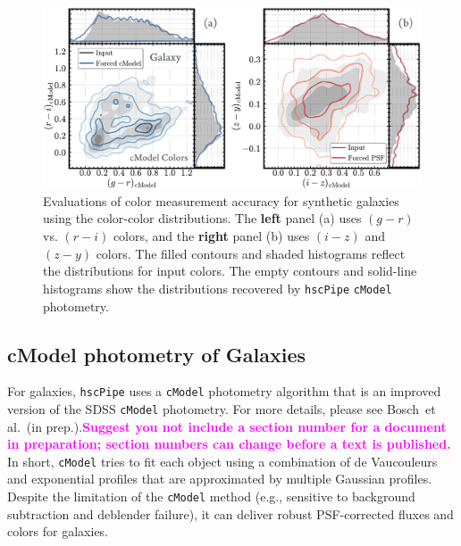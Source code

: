 \documentclass[useamsfonts]{pasj01}
\def\etal{{\ et al.~}}
\def\hscpipe{\texttt{hscPipe}}
\def\cmodel{\texttt{cModel}}
\newcommand{\susan}[1]{\textcolor{magenta} {\textbf{#1}}}
\begin{document}
\begin{figure}
    \begin{center}
        \includegraphics[width=\textwidth]{fig/synpipe_galaxy_cdist}
    \end{center}
    \caption{
        Evaluations of color measurement accuracy for synthetic galaxies
        using the color-color distributions.
        The \textbf{left} panel (a) uses $(g-r)$ vs. $(r-i)$ colors, and the \textbf{right} panel (b)
        uses $(i-z)$ and $(z-y)$ colors.
        The filled contours and shaded histograms reflect the distributions for input
        colors.
        The empty contours and solid-line histograms show the distributions recovered
        by \hscpipe{} \cmodel{} photometry.
        }
    \label{fig:cmodel_cdist}
\end{figure}

\subsection{cModel photometry of Galaxies}
    \label{ssec:cmodel}

  For galaxies, \hscpipe{} uses a \cmodel{} photometry algorithm 
     that is an improved version of the SDSS \cmodel{}
    photometry.
    For more details, please see Bosch\etal (in prep.).\susan{Suggest you not include a section number for a document in preparation; section numbers can change before a text is published. }
    In short, \cmodel{} tries to fit each object using a combination of de Vaucouleurs
    and exponential profiles that are approximated by multiple Gaussian profiles.
    Despite the limitation of the \cmodel{} method (e.g., sensitive to background
    subtraction and deblender failure), it can deliver robust PSF-corrected fluxes and
    colors for galaxies.
\end{document}
